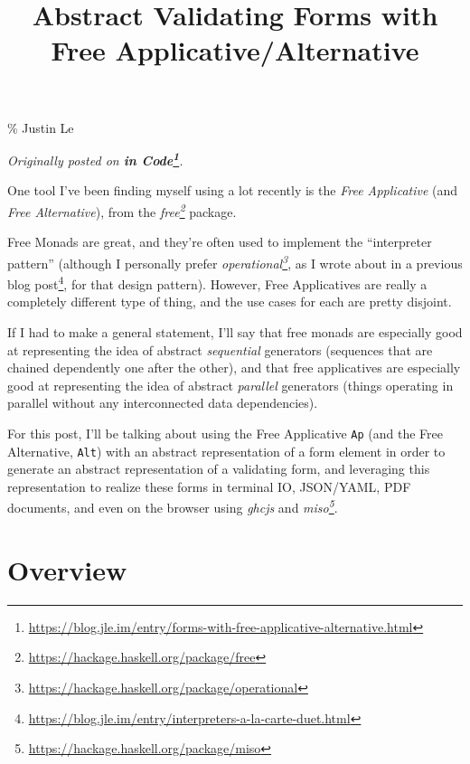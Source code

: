\documentclass[]{article}
\title{Abstract Validating Forms with Free Applicative/Alternative}
\renewcommand{\href}[2]{#2\footnote{\url{#1}}}
\begin{document}
\maketitle

\% Justin Le

\emph{Originally posted on
\textbf{\href{https://blog.jle.im/entry/forms-with-free-applicative-alternative.html}{in
Code}}.}

One tool I've been finding myself using a lot recently is the \emph{Free
Applicative} (and \emph{Free Alternative}), from the
\emph{\href{https://hackage.haskell.org/package/free}{free}} package.

Free Monads are great, and they're often used to implement the ``interpreter
pattern'' (although I personally prefer
\emph{\href{https://hackage.haskell.org/package/operational}{operational}}, as I
wrote about in a
\href{https://blog.jle.im/entry/interpreters-a-la-carte-duet.html}{previous blog
post}, for that design pattern). However, Free Applicatives are really a
completely different type of thing, and the use cases for each are pretty
disjoint.

If I had to make a general statement, I'll say that free monads are especially
good at representing the idea of abstract \emph{sequential} generators
(sequences that are chained dependently one after the other), and that free
applicatives are especially good at representing the idea of abstract
\emph{parallel} generators (things operating in parallel without any
interconnected data dependencies).

For this post, I'll be talking about using the Free Applicative \texttt{Ap} (and
the Free Alternative, \texttt{Alt}) with an abstract representation of a form
element in order to generate an abstract representation of a validating form,
and leveraging this representation to realize these forms in terminal IO,
JSON/YAML, PDF documents, and even on the browser using \emph{ghcjs} and
\emph{\href{https://hackage.haskell.org/package/miso}{miso}}.

\section{Overview}\label{overview}
\end{document}
